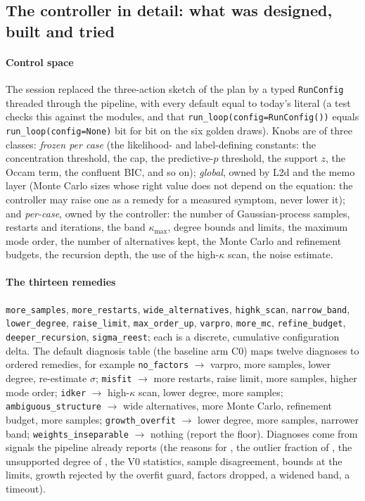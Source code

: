 \subsection{The controller in detail: what was designed, built and tried}\label{sec:controller-built}
\paragraph{Control space} The session replaced the three-action sketch of the plan by a typed \texttt{RunConfig} threaded through the pipeline, with every default equal to today's literal (a test checks this against the modules, and that \texttt{run\_loop(config=RunConfig())} equals \texttt{run\_loop(config=None)} bit for bit on the six golden draws).
Knobs are of three classes: \emph{frozen per case} (the likelihood- and label-defining constants: the concentration threshold, the cap, the predictive-$p$ threshold, the support $z$, the Occam term, the confluent BIC, and so on); \emph{global}, owned by L2d and the memo layer (Monte Carlo sizes whose right value does not depend on the equation: the controller may raise one as a remedy for a measured symptom, never lower it);
and \emph{per-case}, owned by the controller: the number of Gaussian-process samples, restarts and iterations, the band $\kappa_{\max}$, degree bounds and limits, the maximum mode order, the number of alternatives kept, the Monte Carlo and refinement budgets, the recursion depth, the use of the high-$\kappa$ scan, the noise estimate.

\paragraph{The thirteen remedies} \texttt{more\_samples}, \texttt{more\_restarts}, \texttt{wide\_alternatives}, \texttt{highk\_scan}, \texttt{narrow\_band}, \texttt{lower\_degree}, \texttt{raise\_limit}, \texttt{max\_order\_up}, \texttt{varpro}, \texttt{more\_mc}, \texttt{refine\_budget}, \texttt{deeper\_recursion}, \texttt{sigma\_reest}; each is a discrete, cumulative configuration delta.
The default diagnosis table (the baseline arm C0) maps twelve diagnoses to ordered remedies, for example \texttt{no\_factors} $\to$ varpro, more samples, lower degree, re-estimate $\sigma$; \texttt{misfit} $\to$ more restarts, raise limit, more samples, higher mode order; \texttt{idker} $\to$ high-$\kappa$ scan, lower degree, more samples;
\texttt{ambiguous\_structure} $\to$ wide alternatives, more Monte Carlo, refinement budget, more samples; \texttt{growth\_overfit} $\to$ lower degree, more samples, narrower band; \texttt{weights\_inseparable} $\to$ nothing (report the floor). Diagnoses come from signals the pipeline already reports (the reasons for \UND, the outlier fraction of \MIS, the unsupported degree of \IDK, the V0 statistics, sample disagreement, bounds at the limits, growth rejected by the overfit guard, factors dropped, a widened band, a timeout).

